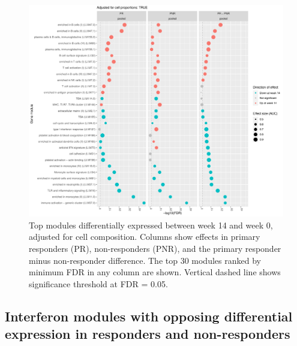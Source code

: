 \begin{figure}
    \centering
    \includegraphics[width=1.0\textwidth,page=1]{mainmatter/figures/chapter_04/plot_gene_set_enrichment.tmodCERNO_panelplot_reversed_C_3R_1R,C_3N_1N,C_(3R_1R)_(3N_1N).cell_prop_correction_TRUE.pdf}
    \caption{Top modules differentially expressed between week 14 and week 0, adjusted for cell composition. Columns show effects in primary responders (PR), non-responders (PNR), and the primary responder minus non-responder difference. The top 30 modules ranked by minimum \gls{FDR} in any column are shown. Vertical dashed line shows significance threshold at FDR = 0.05.}
    \label{fig:multipants_dge_panelPlot_week_14_0_R_N_cellPropT}
\end{figure}

\subsection{Interferon modules with opposing differential expression in responders and non-responders}
\label{subsec:multipants_dge_opposing_interferon}

